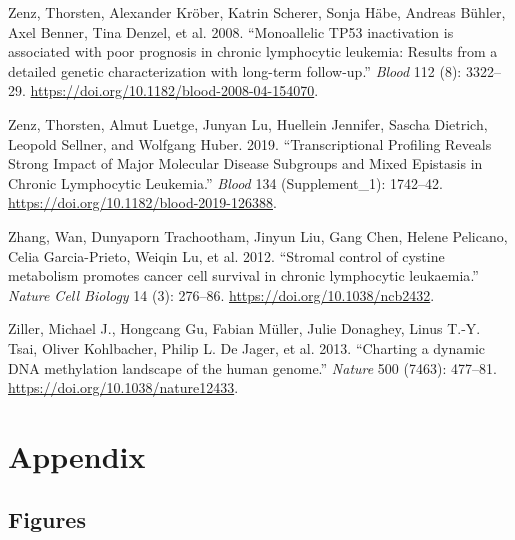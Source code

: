 \documentclass[11pt, a4paper, twosided]{book}
\newenvironment{CSLReferences}%
  {}%
  {\par}
\begin{document}
\begin{CSLReferences}{1}{0}
\leavevmode{}%
Zenz, Thorsten, Alexander Kröber, Katrin Scherer, Sonja Häbe, Andreas Bühler, Axel Benner, Tina Denzel, et al. 2008. {``{Monoallelic TP53 inactivation is associated with poor prognosis in chronic lymphocytic leukemia: Results from a detailed genetic characterization with long-term follow-up}.''} \emph{Blood} 112 (8): 3322--29. \url{https://doi.org/10.1182/blood-2008-04-154070}.

\leavevmode{}%
Zenz, Thorsten, Almut Luetge, Junyan Lu, Huellein Jennifer, Sascha Dietrich, Leopold Sellner, and Wolfgang Huber. 2019. {``{Transcriptional Profiling Reveals Strong Impact of Major Molecular Disease Subgroups and Mixed Epistasis in Chronic Lymphocytic Leukemia}.''} \emph{Blood} 134 (Supplement\_1): 1742--42. \url{https://doi.org/10.1182/blood-2019-126388}.

\leavevmode{}%
Zhang, Wan, Dunyaporn Trachootham, Jinyun Liu, Gang Chen, Helene Pelicano, Celia Garcia-Prieto, Weiqin Lu, et al. 2012. {``{Stromal control of cystine metabolism promotes cancer cell survival in chronic lymphocytic leukaemia}.''} \emph{Nature Cell Biology} 14 (3): 276--86. \url{https://doi.org/10.1038/ncb2432}.

\leavevmode{}%
Ziller, Michael J., Hongcang Gu, Fabian Müller, Julie Donaghey, Linus T.-Y. Tsai, Oliver Kohlbacher, Philip L. De Jager, et al. 2013. {``{Charting a dynamic DNA methylation landscape of the human genome}.''} \emph{Nature} 500 (7463): 477--81. \url{https://doi.org/10.1038/nature12433}.

\end{CSLReferences}
\indent
\setlength{\parindent}{17pt}
\setlength{\leftskip}{0pt}
\setlength{\parskip}{0pt}

\newpage

\hypertarget{appendix}{%
\chapter*{Appendix}\label{appendix}}

\hypertarget{figures}{%
\section*{Figures}\label{figures}}
\end{document}

